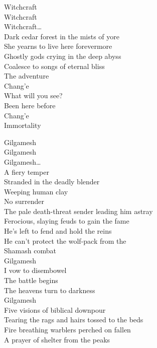 Witchcraft \\
Witchcraft \\
Witchcraft… \\

Dark cedar forest in the mists of yore \\
She yearns to live here forevermore \\
Ghostly gods crying in the deep abyss \\
Coalesce to songs of eternal bliss \\

The adventure \\
Chang'e \\
What will you see? \\
Been here before \\
Chang'e \\
Immortality \\



Gilgamesh \\
Gilgamesh \\
Gilgamesh… \\

A fiery temper \\
Stranded in the deadly blender \\
Weeping human clay \\
No surrender \\
The pale death-threat sender leading him astray \\
Ferocious, slaying feuds to gain the fame \\
He's left to fend and hold the reins \\
He can't protect the wolf-pack from the  \\
Shamash combat \\

Gilgamesh \\
I vow to disembowel \\
The battle begins \\
The heavens turn to darkness \\
Gilgamesh \\

Five visions of biblical downpour \\
Tearing the rags and hairs tossed to the  beds \\
Fire breathing warblers perched on fallen \\
A prayer of shelter from the peaks \\

